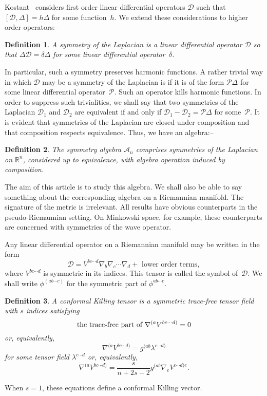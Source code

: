 \documentclass[a4paper,12pt]{amsart}
\newtheorem{defn}{Definition}
\begin{document}
Kostant~\cite{kos} considers first order linear differential operators
${\mathcal D}$ such that $[{\mathcal D},\Delta]=h\Delta$ for some function~$h$.
We extend these considerations to higher order operators:--
\begin{defn} A symmetry of the Laplacian is a linear differential
\mbox{operator} ${\mathcal D}$ so that $\Delta{\mathcal D}=\delta\Delta$ for
some linear differential operator~$\delta$. \end{defn}
\noindent In particular, such a symmetry preserves harmonic functions. A
rather trivial way in which ${\mathcal D}$ may be a symmetry of the Laplacian
is if it is of the form ${\mathcal P}\Delta$ for some linear differential
operator~${\mathcal P}$. Such an operator kills harmonic functions. In order to
suppress such trivialities, we shall say that two symmetries of the Laplacian
${\mathcal D}_1$ and ${\mathcal D}_2$ are equivalent if and only if
${\mathcal D}_1-{\mathcal D}_2={\mathcal P}\Delta$ for some~${\mathcal P}$. It
is evident that symmetries of the Laplacian are closed under composition and
that composition respects equivalence. Thus, we have an algebra:--
\begin{defn}\label{definitionofAn} The symmetry algebra ${\mathcal A}_n$
comprises symmetries of the Laplacian on ${\mathbb R}^n$, considered up to
equivalence, with algebra operation induced by composition. \end{defn}
\noindent The aim of this article is to study this algebra. We shall also be
able to say something about the corresponding algebra on a Riemannian manifold.
The signature of the metric is irrelevant. All results have obvious
counterparts in the pseudo-Riemannian setting. On Minkowski space, for
example, these counterparts are concerned with symmetries of the wave operator.

Any linear differential operator on a Riemannian manifold may be written in
the form
$${\mathcal D}=
V^{bc\cdots d}\nabla_b\nabla_c\cdots\nabla_d+\mbox{ lower order terms},$$
where $V^{bc\cdots d}$ is symmetric in its indices. This tensor is called the
symbol of~${\mathcal D}$. We shall write $\phi^{(ab\cdots c)}$ for the
symmetric part of $\phi^{ab\cdots c}$.

\begin{defn} A conformal Killing tensor
is a symmetric trace-free tensor field with $s$ indices satisfying
\begin{equation}\label{Killingequation}
\mbox{\rm the trace-free part of }\nabla^{(a}V^{bc\cdots d)}=0\end{equation}
or, equivalently,
\begin{equation}\label{killingtensor}
\nabla^{(a}V^{bc\cdots d)}=g^{(ab}\lambda^{c\cdots d)}\end{equation}
for some tensor field $\lambda^{c\cdots d}$ or, equivalently,
\begin{equation}\label{explicitKilling}
\nabla^{(a}V^{bc\cdots d)}=\textstyle\frac{s}{n+2s-2}
g^{(ab}\nabla_eV^{c\cdots d)e}.\end{equation}
\end{defn}
\noindent When $s=1$, these equations define a conformal
Killing vector.
\end{document}
